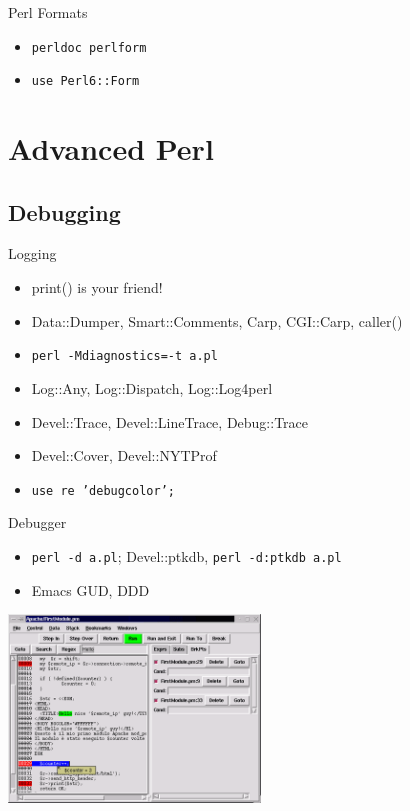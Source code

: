 \documentclass{beamer}
\begin{document}
\begin{frame}{Perl Formats}
  \begin{itemize}
    \item   \texttt{perldoc perlform}
    \item   \texttt{use Perl6::Form}
  \end{itemize}
\end{frame}

\section{Advanced Perl}

\subsection{Debugging}

\begin{frame}{Logging}
  \begin{itemize}
    \item print() is your friend!
    \item Data::Dumper, Smart::Comments, Carp, CGI::Carp, caller()
    \item \texttt{perl -Mdiagnostics=-t a.pl}
    \item Log::Any, Log::Dispatch, Log::Log4perl
    \item Devel::Trace, Devel::LineTrace, Debug::Trace
    \item Devel::Cover, Devel::NYTProf
    \item \texttt{use re 'debugcolor';}
  \end{itemize}
\end{frame}

\begin{frame}{Debugger}
  \begin{itemize}
    \item \texttt{perl -d a.pl}; Devel::ptkdb, \texttt{perl -d:ptkdb a.pl}
    \item Emacs GUD, DDD
  \end{itemize}

  \begin{center}
    \includegraphics[height=5cm]{ptkdb}
  \end{center}
\end{frame}
\end{document}
